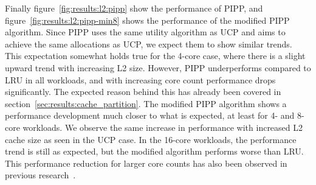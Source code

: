 Finally figure~\ref{fig:results:l2:pipp} show the performance of PIPP, and figure~\ref{fig:results:l2:pipp-min8} shows the performance of the modified PIPP algorithm.
Since PIPP uses the same utility algorithm as UCP and aims to achieve the same allocations as UCP, we expect them to show similar trends.
This expectation somewhat holds true for the 4-core case, where there is a slight upward trend with increasing L2 size.
However, PIPP underperforms compared to LRU in all workloads, and with increasing core count performance drops significantly.
The expected reason behind this has already been covered in section~\ref{sec:results:cache_partition}.
The modified PIPP algorithm shows a performance development much closer to what is expected, at least for 4- and 8-core workloads.
We observe the same increase in performance with increased L2 cache size as seen in the UCP case. 
In the 16-core workloads, the performance trend is still as expected, but the modified algorithm performs worse than LRU.
This performance reduction for larger core counts has also been observed in previous research~\cite{Manikantan2012}.



